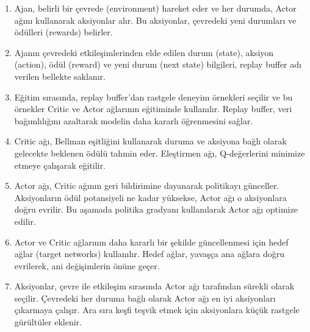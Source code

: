 \begin{enumerate}
    \item Ajan, belirli bir çevrede (environment) hareket eder ve her durumda, Actor ağını kullanarak aksiyonlar alır. Bu aksiyonlar, çevredeki yeni durumları ve ödülleri (rewards) belirler.
    \item Ajanın çevredeki etkileşimlerinden elde edilen durum (state), aksiyon (action), ödül (reward) ve yeni durum (next state) bilgileri, replay buffer adı verilen bellekte saklanır.
    \item Eğitim sırasında, replay buffer’dan rastgele deneyim örnekleri seçilir ve bu örnekler Critic ve Actor ağlarının eğitiminde kullanılır. Replay buffer, veri bağımlılığını azaltarak modelin daha kararlı öğrenmesini sağlar.
    \item Critic ağı, Bellman eşitliğini kullanarak duruma ve aksiyona bağlı olarak gelecekte beklenen ödülü tahmin eder. Eleştirmen ağı, Q-değerlerini minimize etmeye çalışarak eğitilir.
    \item Actor ağı, Critic ağının geri bildirimine dayanarak politikayı günceller. Aksiyonların ödül potansiyeli ne kadar yüksekse, Actor ağı o aksiyonlara doğru evrilir. Bu aşamada politika gradyanı kullanılarak Actor ağı optimize edilir.
    \item Actor ve Critic ağlarının daha kararlı bir şekilde güncellenmesi için hedef ağlar (target networks) kullanılır. Hedef ağlar, yavaşça ana ağlara doğru evrilerek, ani değişimlerin önüne geçer.
    \item Aksiyonlar, çevre ile etkileşim sırasında Actor ağı tarafından sürekli olarak seçilir. Çevredeki her duruma bağlı olarak Actor ağı en iyi aksiyonları çıkarmaya çalışır. Ara sıra keşfi teşvik etmek için aksiyonlara küçük rastgele gürültüler eklenir.
\end{enumerate}

\newpage